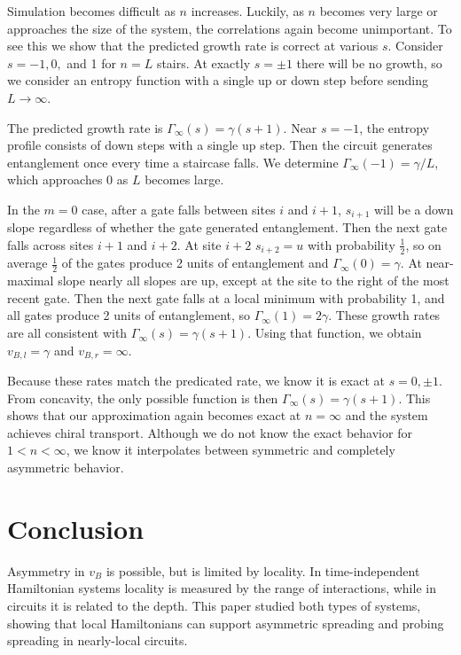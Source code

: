 \documentclass[aps,prx,reprint,superscriptaddress, longbibliography]{revtex4-1}
\newcommand{\half}{\frac{1}{2}}
\begin{document}
Simulation becomes difficult as $n$ increases.
Luckily, as $n$ becomes very large or approaches the size of the system, the correlations again become unimportant. To see this we show that the predicted growth rate is correct at various $s$.
Consider $s = -1, 0,$ and 1 for $n=L$ stairs. At exactly $s=\pm1$ there will be no growth, so we consider an entropy function with a single up or down step before sending $L\to\infty$.

The predicted growth rate is $\Gamma_\infty(s)=\gamma(s+1)$. Near $s=-1$, the entropy profile consists of down steps with a single up step. Then the circuit generates entanglement once every time a staircase falls. We determine $\Gamma_\infty(-1)=\gamma/L$, which approaches 0 as $L$ becomes large.

In the $m = 0$ case, after a gate falls between sites $i$ and $i + 1$, $s_{i+1}$ will be a down slope regardless of whether the gate generated entanglement. Then the next gate falls across sites $i + 1$ and $i+2$. At site $i+2$ $s_{i+2} = u$ with probability $\half$, so on average $\half$ of the gates produce 2 units of entanglement and $\Gamma_\infty(0)=\gamma$. At near-maximal slope nearly all slopes are up, except at the site to the right of the most recent gate. Then the next gate falls at a local minimum with probability 1, and all gates produce 2 units of entanglement, so $\Gamma_\infty(1)=2\gamma$. These growth rates are all consistent with $\Gamma_\infty(s)=\gamma(s+1)$. Using that function, we obtain $v_{B,l}=\gamma$ and $v_{B,r}=\infty$.

Because these rates match the predicated rate, we know it is exact at $s=0, \pm1$. From concavity, the only possible function is then $\Gamma_\infty(s)=\gamma(s+1)$. This shows that our approximation again becomes exact at $n=\infty$ and the system achieves chiral transport. Although we do not know the exact behavior for $1<n<\infty$, we know it interpolates between symmetric and completely asymmetric behavior.

\section{Conclusion}

Asymmetry in $v_B$ is possible, but is limited by locality. In time-independent Hamiltonian systems locality is measured by the range of interactions, while in circuits it is related to the depth. This paper studied both types of systems, showing that local Hamiltonians can support asymmetric spreading and probing spreading in nearly-local circuits. 
\end{document}
